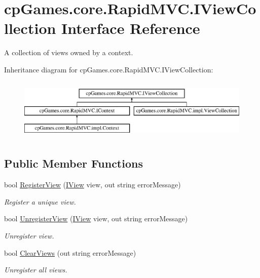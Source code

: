 \hypertarget{interfacecp_games_1_1core_1_1_rapid_m_v_c_1_1_i_view_collection}{}\section{cp\+Games.\+core.\+Rapid\+M\+V\+C.\+I\+View\+Collection Interface Reference}
\label{interfacecp_games_1_1core_1_1_rapid_m_v_c_1_1_i_view_collection}


A collection of views owned by a context.  


Inheritance diagram for cp\+Games.\+core.\+Rapid\+M\+V\+C.\+I\+View\+Collection\+:\begin{figure}[H]
\begin{center}
\leavevmode
\includegraphics[height=2.989324cm]{interfacecp_games_1_1core_1_1_rapid_m_v_c_1_1_i_view_collection}
\end{center}
\end{figure}
\subsection*{Public Member Functions}
\begin{DoxyCompactItemize}
\item 
bool \mbox{\hyperlink{interfacecp_games_1_1core_1_1_rapid_m_v_c_1_1_i_view_collection_aba8465ad92ed63a4ad210c60d50cfc56}{Register\+View}} (\mbox{\hyperlink{interfacecp_games_1_1core_1_1_rapid_m_v_c_1_1_i_view}{I\+View}} view, out string error\+Message)
\begin{DoxyCompactList}\small\item\em Register a unique view. \end{DoxyCompactList}\item 
bool \mbox{\hyperlink{interfacecp_games_1_1core_1_1_rapid_m_v_c_1_1_i_view_collection_acc10b801eec02af0165b9e558a915682}{Unregister\+View}} (\mbox{\hyperlink{interfacecp_games_1_1core_1_1_rapid_m_v_c_1_1_i_view}{I\+View}} view, out string error\+Message)
\begin{DoxyCompactList}\small\item\em Unregister view. \end{DoxyCompactList}\item 
bool \mbox{\hyperlink{interfacecp_games_1_1core_1_1_rapid_m_v_c_1_1_i_view_collection_ab7631908f42053edeb586ac79ffbb2c0}{Clear\+Views}} (out string error\+Message)
\begin{DoxyCompactList}\small\item\em Unregister all views. \end{DoxyCompactList}\end{DoxyCompactItemize}

